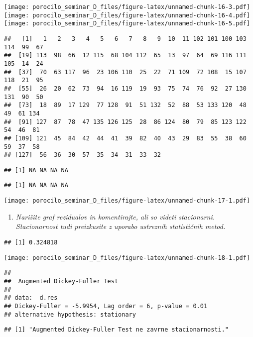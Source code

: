 \documentclass[
]{article}
\providecommand{\tightlist}{%
  \setlength{\itemsep}{0pt}\setlength{\parskip}{0pt}}
\begin{document}
\texttt{[image: porocilo\_seminar\_D\_files/figure-latex/unnamed-chunk-16-3.pdf]}
\texttt{[image: porocilo\_seminar\_D\_files/figure-latex/unnamed-chunk-16-4.pdf]}
\texttt{[image: porocilo\_seminar\_D\_files/figure-latex/unnamed-chunk-16-5.pdf]}

\begin{verbatim}
##   [1]   1   2   3   4   5   6   7   8   9  10  11 102 101 100 103 114  99  67
##  [19] 113  98  66  12 115  68 104 112  65  13  97  64  69 116 111 105  14  24
##  [37]  70  63 117  96  23 106 110  25  22  71 109  72 108  15 107 118  21  95
##  [55]  26  20  62  73  94  16 119  19  93  75  74  76  92  27 130 131  90  50
##  [73]  18  89  17 129  77 128  91  51 132  52  88  53 133 120  48  49  61 134
##  [91] 127  87  78  47 135 126 125  28  86 124  80  79  85 123 122  54  46  81
## [109] 121  45  84  42  44  41  39  82  40  43  29  83  55  38  60  59  37  58
## [127]  56  36  30  57  35  34  31  33  32
\end{verbatim}

\begin{verbatim}
## [1] NA NA NA NA
\end{verbatim}

\begin{verbatim}
## [1] NA NA NA NA
\end{verbatim}

\texttt{[image: porocilo\_seminar\_D\_files/figure-latex/unnamed-chunk-17-1.pdf]}

\begin{enumerate}
\def\labelenumi{\arabic{enumi}.}
\setcounter{enumi}{2}
\tightlist
\item
  \emph{Narišite graf rezidualov in komentirajte, ali so videti
  stacionarni. Stacionarnost tudi preizkusite z uporabo ustreznih
  statističnih metod.}
\end{enumerate}

\begin{verbatim}
## [1] 0.324818
\end{verbatim}

\texttt{[image: porocilo\_seminar\_D\_files/figure-latex/unnamed-chunk-18-1.pdf]}

\begin{verbatim}
## 
##  Augmented Dickey-Fuller Test
## 
## data:  d.res
## Dickey-Fuller = -5.9954, Lag order = 6, p-value = 0.01
## alternative hypothesis: stationary
\end{verbatim}

\begin{verbatim}
## [1] "Augmented Dickey-Fuller Test ne zavrne stacionarnosti."
\end{verbatim}
\end{document}
